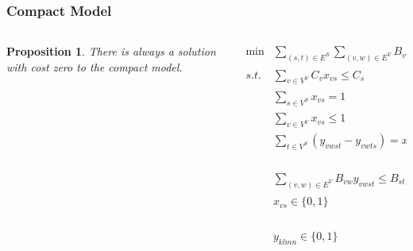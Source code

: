 \documentclass[english]{beamer}
\newtheorem{proposition}{Proposition}
\begin{document}
\begin{frame}
\frametitle{Compact Model}
{
\begin{columns}
\begin{column}{0.35\textwidth}
\begin{proposition}
There is always a solution with cost zero to the compact model.
\end{proposition}
\end{column}
\begin{column}{0.7\textwidth}
\tiny
\begin{align}
     \min & \sum\limits_{(s,t) \in E^{S}} \sum\limits_{(v,w) \in E^{V}} B_{vw}~ y_{vwst} & \nonumber \\
    s.t. & \sum\limits_{v \in V^{V}} C_{v} x_{vs} \leq C_{s}                                   & \forall s \in V^{S}  \nonumber \\
         & \sum\limits_{s \in V^{S}} x_{vs} = 1                                                & \forall v \in V^{V}  \nonumber\\
         & \sum\limits_{v \in V^{V}} x_{vs} \leq 1                                             & \forall s \in V^{S} \nonumber \\
         & \sum\limits_{t \in V^{S}} ( y_{vwst} - y_{vwts}) = x_{vs} - x_{ws} & \forall (v,w) \in E^{V}, \nonumber \\ 
         &                                                                    & s \in V^{S} \nonumber \\
         & \sum\limits_{(v,w) \in E^{V}} B_{vw}  y_{vwst} \leq B_{st}                 & \forall (s,t) \in E^{S} \nonumber \\
         & x_{vs} \in \{0,1\}                                                                  & \forall v \in V^{V}, \nonumber \\
         &                                                                                      & s \in V^{S} \nonumber \\
         & y_{klmn} \in \{0,1\}                                                         & \forall (k,l) \in E^{V}, \nonumber \\
         &                                                                                 & (m,n) \in E^{S} \nonumber  
\end{align} 
\end{column}
\end{columns}
}
\end{frame}
\end{document}
